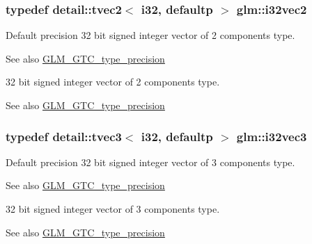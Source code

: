 \subsubsection[{\texorpdfstring{i32vec2}{i32vec2}}]{\setlength{\rightskip}{0pt plus 5cm}typedef detail\+::tvec2$<$ i32, defaultp $>$ {\bf glm\+::i32vec2}}\hypertarget{group__gtc__type__precision_gabb9ac4a278f8a8e3a3928dc9bef81089}{}\label{group__gtc__type__precision_gabb9ac4a278f8a8e3a3928dc9bef81089}
Default precision 32 bit signed integer vector of 2 components type. \begin{DoxySeeAlso}{See also}
\hyperlink{group__gtc__type__precision}{G\+L\+M\+\_\+\+G\+T\+C\+\_\+type\+\_\+precision}
\end{DoxySeeAlso}
32 bit signed integer vector of 2 components type. \begin{DoxySeeAlso}{See also}
\hyperlink{group__gtc__type__precision}{G\+L\+M\+\_\+\+G\+T\+C\+\_\+type\+\_\+precision} 
\end{DoxySeeAlso}
\subsubsection[{\texorpdfstring{i32vec3}{i32vec3}}]{\setlength{\rightskip}{0pt plus 5cm}typedef detail\+::tvec3$<$ i32, defaultp $>$ {\bf glm\+::i32vec3}}\hypertarget{group__gtc__type__precision_ga79a21b299190b6fee673087376753db0}{}\label{group__gtc__type__precision_ga79a21b299190b6fee673087376753db0}
Default precision 32 bit signed integer vector of 3 components type. \begin{DoxySeeAlso}{See also}
\hyperlink{group__gtc__type__precision}{G\+L\+M\+\_\+\+G\+T\+C\+\_\+type\+\_\+precision}
\end{DoxySeeAlso}
32 bit signed integer vector of 3 components type. \begin{DoxySeeAlso}{See also}
\hyperlink{group__gtc__type__precision}{G\+L\+M\+\_\+\+G\+T\+C\+\_\+type\+\_\+precision} 
\end{DoxySeeAlso}
